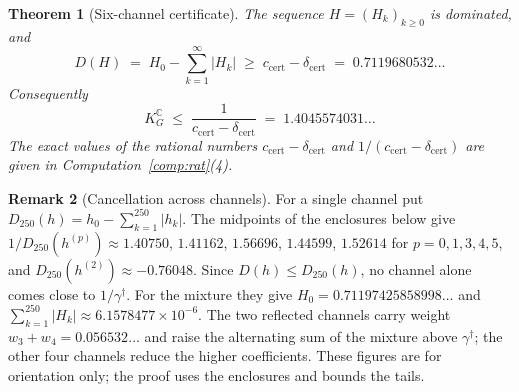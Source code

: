 \documentclass[11pt,reqno]{amsart}
\newtheorem{theorem}{Theorem}[section]
\theoremstyle{definition}
\newtheorem{remark}[theorem]{Remark}
\numberwithin{equation}{section}
\newcommand{\C}{\mathbb{C}}
\newcommand{\KGC}{K_G^{\C}}
\newcommand{\gd}{\gamma^\dagger}
\newcommand{\ccert}{c_{\mathrm{cert}}}
\newcommand{\dcert}{\delta_{\mathrm{cert}}}
\begin{document}
\begin{theorem}[Six-channel certificate]\label{thm:cert}
The sequence $H=(H_k)_{k\ge0}$ is dominated, and
\[
  D(H)\;=\;H_0-\sum_{k=1}^\infty|H_k|\;\ge\;\ccert-\dcert\;=\;0.7119680532\ldots
\]
Consequently
\[
  \KGC\;\le\;\frac{1}{\ccert-\dcert}\;=\;1.4045574031\ldots
\]
The exact values of the rational numbers $\ccert-\dcert$ and $1/(\ccert-\dcert)$ are given in Computation~\ref{comp:rat}(4).
\end{theorem}

\begin{remark}[Cancellation across channels]\label{rem:cancel}
For a single channel put $D_{250}(h)=h_0-\sum_{k=1}^{250}|h_k|$. The midpoints of the enclosures below give $1/D_{250}(h^{(p)})\approx1.40750$, $1.41162$, $1.56696$, $1.44599$, $1.52614$ for $p=0,1,3,4,5$, and $D_{250}(h^{(2)})\approx-0.76048$. Since $D(h)\le D_{250}(h)$, no channel alone comes close to $1/\gd$. For the mixture they give $H_0=0.71197425858998\ldots$ and $\sum_{k=1}^{250}|H_k|\approx6.1578477\times10^{-6}$. The two reflected channels carry weight $w_3+w_4=0.056532\ldots$ and raise the alternating sum of the mixture above $\gd$; the other four channels reduce the higher coefficients. These figures are for orientation only; the proof uses the enclosures and bounds the tails.
\end{remark}
\end{document}
